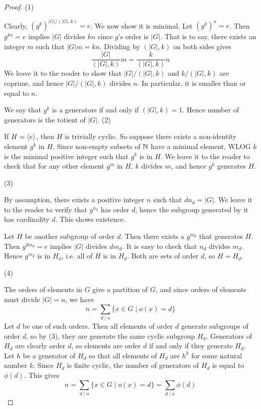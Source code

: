\documentclass[../book.tex]{subfiles}
\begin{document}
\begin{proof}
    (1)
    
        Clearly, $(g^k)^{|G|/(|G|,k)} = e$. 
        We now show it is minimal. 
        Let $(g^k)^n = e$. 
        Then $g^{kn} = e$ implies $|G|$ divides $kn$ since $g$'s order is $|G|$. 
        That is to say, there exists an integer $m$ such that $|G| m = k n$. 
        Dividing by $(|G|,k)$ on both sides gives \[
            \frac{|G|}{(|G|,k)} m = \frac{k}{(|G|,k)} n
        \]
        We leave it to the reader to show that 
        $|G| / (|G|,k)$ and $k / (|G|, k)$ are coprime, 
        and hence $|G| / (|G|,k)$ divides $n$. 
        In particular, it is smaller than or equal to $n$.
        
        We say that $g^k$ is a generators if and only if $(|G|,k) = 1$.
        Hence number of generators is the totient of $|G|$. 
    (2)
        
        If $H = \langle e\rangle$, then $H$ is trivially cyclic.
        So suppose there exists a non-identity element $g^k$ in $H$.
        Since non-empty subsets of $\mathbb{N}$ have a minimal element, 
        WLOG $k$ is the minimal positive integer such that $g^k$ is in $H$.
        We leave it to the reader to check that for any other element $g^m$ in $H$,
        $k$ divides $m$, and hence $g^k$ generates $H$. 
    
    (3)
        
        By assumption, there exists a positive integer $n$ such that $d n_d = |G|$.
        We leave it to the reader to verify that $g^{n_d}$ has order $d$,
        hence the subgroup generated by it has cardinality $d$. 
        This shows existence. 
        
        Let $H$ be another subgroup of order $d$. 
        Then there exists a $g^{m_d}$ that generates $H$. 
        Then $g^{dm_d} = e$ implies $|G|$ divides $dm_d$. 
        It is easy to check that $n_d$ divides $m_d$.
        Hence $g^{m_d}$ is in $H_d$, i.e. all of $H$ is in $H_d$. 
        Both are sets of order $d$, so $H = H_d$.
        
    (4)
        
        The orders of elements in $G$ give a partition of $G$,
        and since orders of elements must divide $|G| = n$, we have \[
            n = \sum_{d \mid n} \{x \in G \mid o(x) = d\}
        \]
        Let $d$ be one of such orders. 
        Then all elements of order $d$ generate subgroups of order $d$,
        so by (3), they are generate the same cyclic subgroup $H_d$. 
        Generators of $H_d$ are clearly order $d$, 
        so elements are order $d$ if and only if they generate $H_d$.
        Let $h$ be a generator of $H_d$ so that 
        all elements of $H_d$ are $h^k$ for some natural number $k$. 
        Since $H_d$ is finite cyclic, 
        the number of generators of $H_d$ is equal to $\phi(d)$. 
        This gives \[
            n = \sum_{d \mid n} \{x \in G \mid o(x) = d\} = \sum_{d \mid n} \phi(d)
        \]
    
\end{proof}
\end{document}
